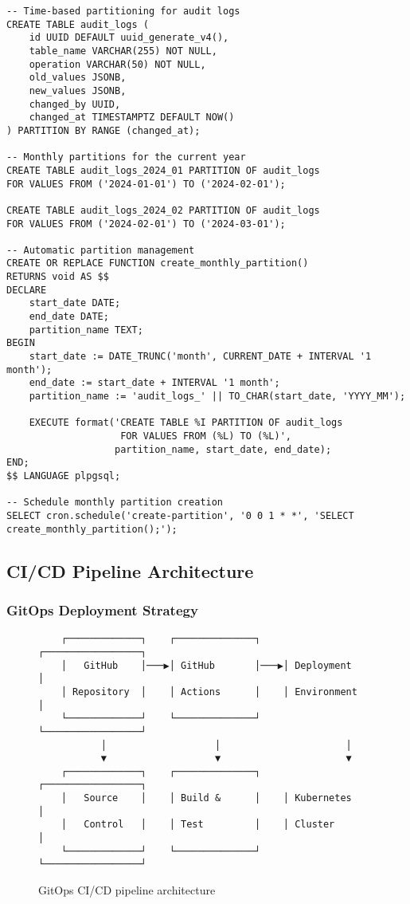 \begin{verbatim}
-- Time-based partitioning for audit logs
CREATE TABLE audit_logs (
    id UUID DEFAULT uuid_generate_v4(),
    table_name VARCHAR(255) NOT NULL,
    operation VARCHAR(50) NOT NULL,
    old_values JSONB,
    new_values JSONB,
    changed_by UUID,
    changed_at TIMESTAMPTZ DEFAULT NOW()
) PARTITION BY RANGE (changed_at);

-- Monthly partitions for the current year
CREATE TABLE audit_logs_2024_01 PARTITION OF audit_logs
FOR VALUES FROM ('2024-01-01') TO ('2024-02-01');

CREATE TABLE audit_logs_2024_02 PARTITION OF audit_logs
FOR VALUES FROM ('2024-02-01') TO ('2024-03-01');

-- Automatic partition management
CREATE OR REPLACE FUNCTION create_monthly_partition()
RETURNS void AS $$
DECLARE
    start_date DATE;
    end_date DATE;
    partition_name TEXT;
BEGIN
    start_date := DATE_TRUNC('month', CURRENT_DATE + INTERVAL '1 month');
    end_date := start_date + INTERVAL '1 month';
    partition_name := 'audit_logs_' || TO_CHAR(start_date, 'YYYY_MM');
    
    EXECUTE format('CREATE TABLE %I PARTITION OF audit_logs 
                    FOR VALUES FROM (%L) TO (%L)', 
                   partition_name, start_date, end_date);
END;
$$ LANGUAGE plpgsql;

-- Schedule monthly partition creation
SELECT cron.schedule('create-partition', '0 0 1 * *', 'SELECT create_monthly_partition();');
\end{verbatim}

\subsection{CI/CD Pipeline Architecture}

\subsubsection{GitOps Deployment Strategy}

\begin{figure}[h]
  \centering
  \begin{minipage}{\linewidth}
    \centering
    \begin{verbatim}
    ┌─────────────┐    ┌──────────────┐    ┌─────────────────┐
    │   GitHub    │───▶│ GitHub       │───▶│ Deployment      │
    │ Repository  │    │ Actions      │    │ Environment     │
    └─────────────┘    └──────────────┘    └─────────────────┘
           │                   │                      │
           ▼                   ▼                      ▼
    ┌─────────────┐    ┌──────────────┐    ┌─────────────────┐
    │   Source    │    │ Build &      │    │ Kubernetes      │
    │   Control   │    │ Test         │    │ Cluster         │
    └─────────────┘    └──────────────┘    └─────────────────┘
    \end{verbatim}
    \caption{GitOps CI/CD pipeline architecture}
  \end{minipage}
\end{figure}

